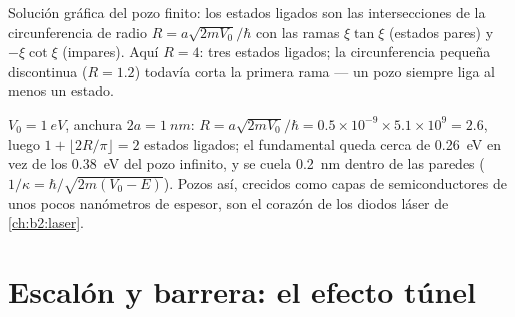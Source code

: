 \begin{omfigure}

{\small Solución gráfica del pozo finito: los estados ligados son
las intersecciones de la circunferencia de radio $R = a\sqrt{2mV_0}/\hbar$ con
las ramas $\xi\tan\xi$ (estados pares) y $-\xi\cot\xi$ (impares). Aquí
$R = 4$: tres estados ligados; la circunferencia pequeña discontinua ($R = 1.2$) todavía
corta la primera rama --- un pozo siempre liga al menos un estado.}
\end{omfigure}

\begin{example}\label{ex:b2:potential-wells-tunneling:finite}
$V_0 = \qty{1}{eV}$, anchura $2a = \qty{1}{nm}$: $R = a\sqrt{2mV_0}/\hbar = 0.5 \times
10^{-9} \times 5.1 \times 10^9 = 2.6$, luego $1 + \lfloor 2R/\pi\rfloor = 2$ estados
ligados; el fundamental queda cerca de \qty{0.26}{eV} en vez de los
\qty{0.38}{eV} del pozo infinito, y se cuela \qty{0.2}{nm} dentro de las paredes
($1/\kappa = \hbar/\sqrt{2m(V_0 - E)}$). Pozos así, crecidos como capas de
semiconductores de unos pocos nanómetros de espesor, son el corazón de los
diodos láser de \cref{ch:b2:laser}.
\end{example}

\section{Escalón y barrera: el efecto túnel}

